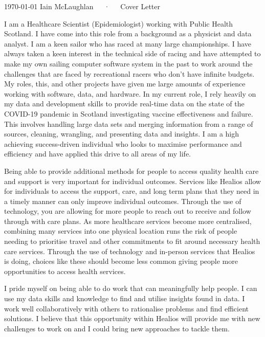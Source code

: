 \documentclass[11pt, a4paper]{awesome-cv}
\begin{document}
\makecvheader[R]

\makecvfooter
  {\today}
  {Iain McLaughlan~~~·~~~Cover Letter}
  {}

\makelettertitle

\begin{cvletter}

I am a Healthcare Scientist (Epidemiologist) working with Public Health Scotland. I have come into this role from a background as a physicist and data analyst. I am a keen sailor who has raced at many large championships. I have always taken a keen interest in the technical side of racing and have attempted to make my own sailing computer software system in the past to work around the challenges that are faced by recreational racers who don't have infinite budgets. My roles, this, and other projects have given me large amounts of experience working with software, data, and hardware. In my current role, I rely heavily on my data and development skills to provide real-time data on the state of the COVID-19 pandemic in Scotland investigating vaccine effectiveness and failure. This involves handling large data sets and merging information from a range of sources, cleaning, wrangling, and presenting data and insights. I am a high achieving success-driven individual who looks to maximise performance and efficiency and have applied this drive to all areas of my life.


Being able to provide additional methods for people to access quality health care and support is very important for individual outcomes. Services like Healios allow for individuals to access the support, care, and long term plans that they need in a timely manner can only improve individual outcomes. Through the use of technology, you are allowing for more people to reach out to receive and follow through with care plans. As more healthcare services become more centralised, combining many services into one physical location runs the risk of people needing to prioritise travel and other commitments to fit around necessary health care services. Through the use of technology and in-person services that Healios is doing, choices like these should become less common giving people more opportunities to access health services. 


I pride myself on being able to do work that can meaningfully help people. I can use my data skills and knowledge to find and utilise insights found in data. I work well collaboratively with others to rationalise problems and find efficient solutions. I believe that this opportunity within Healios will provide me with new challenges to work on and I could bring new approaches to tackle them. 


\end{cvletter}

\makeletterclosing
\end{document}

